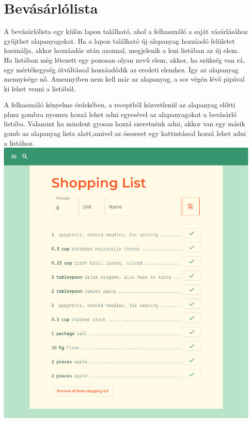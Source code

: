 \documentclass[12pt]{report}
\theoremstyle{definition}
\begin{document}
	{\color{red}{
			A kalóriaszámlálás kizárólag akkor fut le, ha a receptlekérdezés során nem létezett az eredeti oldalon a kalória információ, vagy ha a recept manuálisan lett létrehozva. Ahhoz, hogy megfelelő eredményt kapjunk, ha az alapanyagokból nem tudunk legalább 80 százalékból tápanyag adatot megkapni, akkor nem lesz megjelenítve kalória információ a recepthez. Amennyiben megfelelő mennyiségű adatunk van, a korábban említett mértékegység átváltásokkal egységesítem az alapanyagokat a tápanyag táblázat alap értékéhez, aztán azt összeadva kapjuk a kalória adatot a recepthez.
		}}

\section{Bevásárlólista}
A bevásárlólista egy külön lapon található, ahol a felhasználó a saját vásárlásához gyűjthet alapanyagokat. Ha a lapon található új alapanyag hozzáadó felületet használja, akkor hozzáadás után azonnal, megjelenik a leni listában az új elem. Ha  listában még létezett egy ponosan olyan nevű elem, akkor, ha szükség van rá, egy mértékegység átváltással hozzáadódik az eredeti elemhez. Így az alapanyag mennyisége nő. Amennyiben nem kell már az alapanyag, a sor végén lévő pipával ki lehet venni a listából.

A felhasználó kényelme érdekében, a receptből közvetlenül az alapanyag előtti plusz gombra nyomva hozzá lehet adni egyesével az alapanyagokat a bevásárló listába. Valamint ha mindent gyosan hozzá szeretnénk adni, akkor van egy másik gomb az alapanyag lista alatt,amivel az összeset egy kattintással hozzá lehet adni a listához.\\

\noindent
\includegraphics[scale=0.4]{pictures/web_shoppinglist.png}
\end{document}
